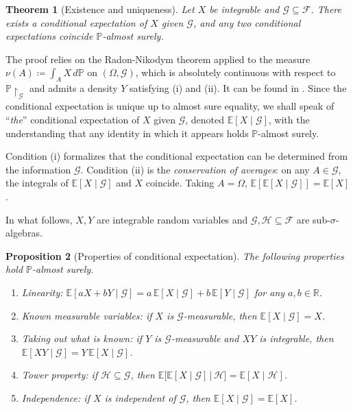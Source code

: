 \documentclass[11pt,a4paper,oneside]{report}
\theoremstyle{plain}
\newtheorem{teorema}{Theorem}[chapter]
\newtheorem{proposicion}[teorema]{Proposition}
\theoremstyle{definition}
\theoremstyle{remark}
\newcommand{\R}{\mathbb{R}}
\newcommand{\E}{\mathbb{E}}
\newcommand{\PP}{\mathbb{P}}
\newcommand{\F}{\mathcal{F}}
\newcommand{\G}{\mathcal{G}}
\newcommand{\HH}{\mathcal{H}}
\newcommand{\1}{\mathbf{1}}
\newcommand{\eqdef}{\coloneqq}
\begin{document}
\begin{teorema}[Existence and uniqueness]
\label{teo:existencia_esperanza_condicional}
Let $X$ be integrable and $\G \subseteq \F$. There exists a
conditional expectation of $X$ given $\G$, and any two conditional
expectations coincide $\PP$-almost surely.
\end{teorema}

The proof relies on the Radon-Nikodym theorem applied to the measure
$\nu(A) \eqdef \int_A X \, d\PP$ on $(\Omega, \G)$, which is
absolutely continuous with respect to $\PP\!\restriction_\G$ and
admits a density $Y$ satisfying (i) and (ii). It can be found in
\cite{williams}. Since the conditional expectation is unique up to
almost sure equality, we shall speak of ``\emph{the}'' conditional
expectation of $X$ given $\G$, denoted $\E[X \mid \G]$, with the
understanding that any identity in which it appears holds
$\PP$-almost surely.

Condition (i) formalizes that the conditional expectation can be
determined from the information $\G$. Condition (ii) is the
\emph{conservation of averages}: on any $A \in \G$, the integrals of
$\E[X \mid \G]$ and $X$ coincide. Taking $A = \Omega$,
$\E[\E[X \mid \G]] = \E[X]$.

In what follows, $X, Y$ are
integrable random variables and $\G, \HH \subseteq \F$ are
sub-$\sigma$-algebras.

\begin{proposicion}[Properties of conditional expectation]
\label{prop:propiedades_esperanza_cond}
The following properties hold $\PP$-almost surely.
\begin{enumerate}[label=\textnormal{(\roman*)}]
  \item \emph{Linearity}: $\E[a X + b Y \mid \G] = a\, \E[X \mid \G]
        + b\, \E[Y \mid \G]$ for any $a, b \in \R$.
  \item \emph{Known measurable variables}: if $X$ is
        $\G$-measurable, then $\E[X \mid \G] = X$.
  \item \emph{Taking out what is known}: if $Y$ is $\G$-measurable and
        $XY$ is integrable, then $\E[XY \mid \G] = Y\, \E[X \mid \G]$.
  \item \emph{Tower property}: if $\HH \subseteq \G$, then
        $\E\!\bigl[\E[X \mid \G] \,\big|\, \HH\bigr] = \E[X \mid \HH]$.
  \item Independence: if $X$ is independent of $\G$, then
        $\E[X \mid \G] = \E[X]$.
\end{enumerate}
\end{proposicion}
\end{document}
